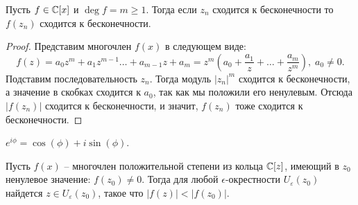 \begin{lemma}
    \label{lemma5}
    Пусть $f \in \mathbb{C}[x]$ и $\deg f = m \geq 1$. Тогда если $z_n$ сходится к бесконечности то $f(z_n)$ сходится к бесконечности.
\end{lemma}

\begin{proof}
    Представим многочлен $f(x)$ в следующем виде:
    $$f(z) = a_0 z^m + a_1 z^{m-1} \dots + a_{m-1} z + a_m = z^m (a_0 + \frac{a_1}{z} + \dots + \frac{a_m}{z^m}), \; a_0 \neq 0.$$
    Подставим последовательность $z_n$. Тогда модуль $|z_n|^m$ сходится к бесконечности, а значение 
    в скобках сходится к $a_0$, так как мы положили его ненулевым. Отсюда $|f(z_n)|$ сходится 
    к бесконечности, и значит, $f(z_n)$ тоже сходится к бесконечности.
\end{proof}

\begin{reminder}
    $e^{i\phi} = \cos(\phi) + i\sin(\phi)$.
\end{reminder}

\begin{lemma}[Д'Аламбера]
    \label{lemma6}
    Пусть $f(x)$ -- многочлен положительной степени из кольца $\mathbb{C}[z]$, имеющий в $z_0$ ненулевое 
    значение: $f(z_0) \neq 0$. Тогда для любой $\epsilon$-окрестности $U_{\varepsilon}(z_0)$ найдется 
    $z \in U_{\varepsilon}(z_0)$, такое что $|f(z)| < |f(z_0)|$.
\end{lemma}

